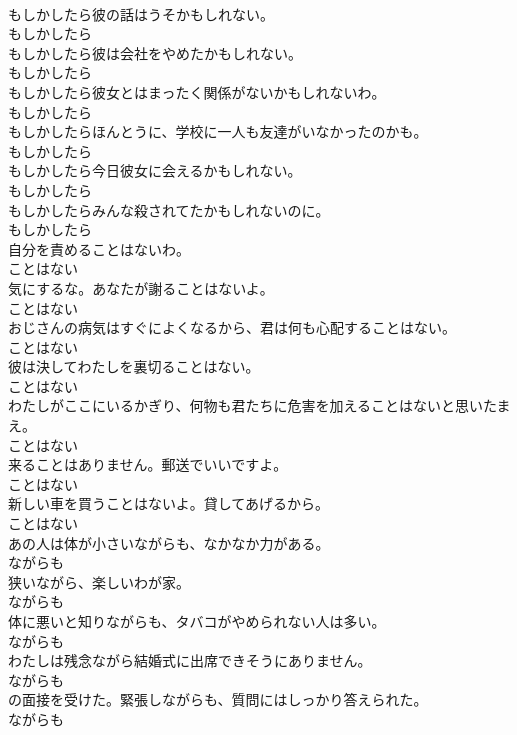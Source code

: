 \documentclass[8pt]{extreport}
\begin{document}
\begin{CJK}{UTF8}{min}
\\	もしかしたら彼の話はうそかもしれない。	
\\	もしかしたら
\\	もしかしたら彼は会社をやめたかもしれない。	
\\	もしかしたら
\\	もしかしたら彼女とはまったく関係がないかもしれないわ。	
\\	もしかしたら
\\	もしかしたらほんとうに、学校に一人も友達がいなかったのかも。	
\\	もしかしたら
\\	もしかしたら今日彼女に会えるかもしれない。	
\\	もしかしたら
\\	もしかしたらみんな殺されてたかもしれないのに。	
\\	もしかしたら
\\	自分を責めることはないわ。	
\\	ことはない
\\	気にするな。あなたが謝ることはないよ。	
\\	ことはない
\\	おじさんの病気はすぐによくなるから、君は何も心配することはない。	
\\	ことはない
\\	彼は決してわたしを裏切ることはない。	
\\	ことはない
\\	わたしがここにいるかぎり、何物も君たちに危害を加えることはないと思いたまえ。	
\\	ことはない
\\	来ることはありません。郵送でいいですよ。	
\\	ことはない
\\	新しい車を買うことはないよ。貸してあげるから。	
\\	ことはない
\\	あの人は体が小さいながらも、なかなか力がある。	
\\	ながらも
\\	狭いながら、楽しいわが家。	
\\	ながらも
\\	体に悪いと知りながらも、タバコがやめられない人は多い。	
\\	ながらも
\\	わたしは残念ながら結婚式に出席できそうにありません。	
\\	ながらも
\\	の面接を受けた。緊張しながらも、質問にはしっかり答えられた。	
\\	ながらも

\end{CJK}
\end{document}
